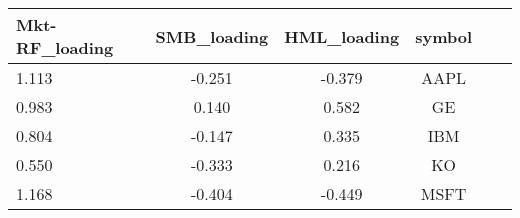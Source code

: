\begin{tabular}{lccccc}
\toprule
Mkt-RF\_loading & SMB\_loading & HML\_loading & symbol \\
\midrule
1.113 & -0.251 & -0.379 & AAPL \\
0.983 & 0.140 & 0.582 & GE \\
0.804 & -0.147 & 0.335 & IBM \\
0.550 & -0.333 & 0.216 & KO \\
1.168 & -0.404 & -0.449 & MSFT \\
\bottomrule
\end{tabular}
